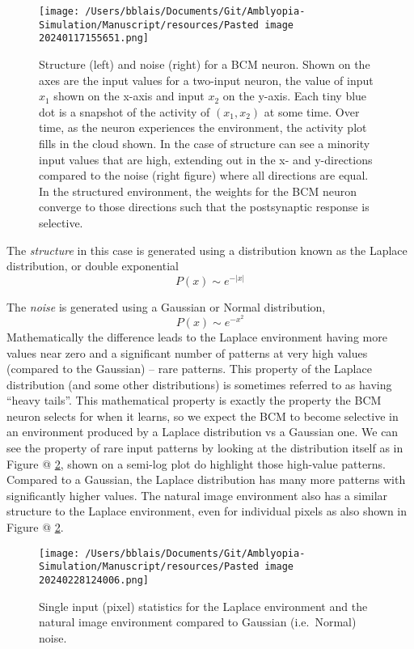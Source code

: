 \documentclass[
]{article}
\begin{document}
\begin{figure}
\centering
\texttt{[image: /Users/bblais/Documents/Git/Amblyopia-Simulation/Manuscript/resources/Pasted image 20240117155651.png]}
\caption{Structure (left) and noise (right) for a BCM neuron. Shown on
the axes are the input values for a two-input neuron, the value of input
\(x_1\) shown on the x-axis and input \(x_2\) on the y-axis. Each tiny
blue dot is a snapshot of the activity of \((x_1,x_2)\) at some time.
Over time, as the neuron experiences the environment, the activity plot
fills in the cloud shown. In the case of structure can see a minority
input values that are high, extending out in the x- and y-directions
compared to the noise (right figure) where all directions are equal. In
the structured environment, the weights for the BCM neuron converge to
those directions such that the postsynaptic response is
selective.}\label{fig:structure_vs_noise}
\end{figure}

The \emph{structure} in this case is generated using a distribution
known as the Laplace distribution, or double exponential \[
P(x) \sim e^{-|x|}
\]

The \emph{noise} is generated using a Gaussian or Normal distribution,
\[
P(x) \sim e^{-x^2}
\] Mathematically the difference leads to the Laplace environment having
more values near zero and a significant number of patterns at very high
values (compared to the Gaussian) -- rare patterns. This property of the
Laplace distribution (and some other distributions) is sometimes
referred to as having ``heavy tails''. This mathematical property is
exactly the property the BCM neuron selects for when it learns, so we
expect the BCM to become selective in an environment produced by a
Laplace distribution vs a Gaussian one. We can see the property of rare
input patterns by looking at the distribution itself as in Figure @
\ref{fig:laplace_dist}, shown on a semi-log plot do highlight those
high-value patterns. Compared to a Gaussian, the Laplace distribution
has many more patterns with significantly higher values. The natural
image environment also has a similar structure to the Laplace
environment, even for individual pixels as also shown in Figure @
\ref{fig:laplace_dist}.

\begin{figure}
\centering
\texttt{[image: /Users/bblais/Documents/Git/Amblyopia-Simulation/Manuscript/resources/Pasted image 20240228124006.png]}
\caption{Single input (pixel) statistics for the Laplace environment and
the natural image environment compared to Gaussian (i.e.~Normal)
noise.}\label{fig:laplace_dist}
\end{figure}
\end{document}
